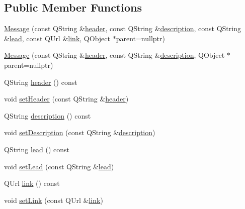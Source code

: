 \subsection*{Public Member Functions}
\begin{DoxyCompactItemize}
\item 
\mbox{\hyperlink{classCSA_1_1Message_aca2e81acce38bd7ac3e2b44669c41e9e}{Message}} (const Q\+String \&\mbox{\hyperlink{classCSA_1_1Message_a4400bbedbca391321c94e3620c743c0d}{header}}, const Q\+String \&\mbox{\hyperlink{classCSA_1_1Message_ad5ab91547afc7777c9921c2973418d19}{description}}, const Q\+String \&\mbox{\hyperlink{classCSA_1_1Message_ade0403777364c446f7cee8ba1897a75c}{lead}}, const Q\+Url \&\mbox{\hyperlink{classCSA_1_1Message_a7ddadacf05fdaa5d973025bc3892f517}{link}}, Q\+Object $\ast$parent=nullptr)
\item 
\mbox{\hyperlink{classCSA_1_1Message_ae1abb7c31a0f40f3601b7d2b21d2fec9}{Message}} (const Q\+String \&\mbox{\hyperlink{classCSA_1_1Message_a4400bbedbca391321c94e3620c743c0d}{header}}, const Q\+String \&\mbox{\hyperlink{classCSA_1_1Message_ad5ab91547afc7777c9921c2973418d19}{description}}, Q\+Object $\ast$parent=nullptr)
\item 
Q\+String \mbox{\hyperlink{classCSA_1_1Message_a4400bbedbca391321c94e3620c743c0d}{header}} () const
\item 
void \mbox{\hyperlink{classCSA_1_1Message_aaa162792bac73c4f20d718c546c7cf5d}{set\+Header}} (const Q\+String \&\mbox{\hyperlink{classCSA_1_1Message_a4400bbedbca391321c94e3620c743c0d}{header}})
\item 
Q\+String \mbox{\hyperlink{classCSA_1_1Message_ad5ab91547afc7777c9921c2973418d19}{description}} () const
\item 
void \mbox{\hyperlink{classCSA_1_1Message_a6f67e046c556922e1d3a477215f1bcec}{set\+Description}} (const Q\+String \&\mbox{\hyperlink{classCSA_1_1Message_ad5ab91547afc7777c9921c2973418d19}{description}})
\item 
Q\+String \mbox{\hyperlink{classCSA_1_1Message_ade0403777364c446f7cee8ba1897a75c}{lead}} () const
\item 
void \mbox{\hyperlink{classCSA_1_1Message_aa70caaac5d69af259fb838f0dd6fde01}{set\+Lead}} (const Q\+String \&\mbox{\hyperlink{classCSA_1_1Message_ade0403777364c446f7cee8ba1897a75c}{lead}})
\item 
Q\+Url \mbox{\hyperlink{classCSA_1_1Message_a7ddadacf05fdaa5d973025bc3892f517}{link}} () const
\item 
void \mbox{\hyperlink{classCSA_1_1Message_aa5443c2828acafd1b31d9c042dbc52f1}{set\+Link}} (const Q\+Url \&\mbox{\hyperlink{classCSA_1_1Message_a7ddadacf05fdaa5d973025bc3892f517}{link}})
\end{DoxyCompactItemize}
